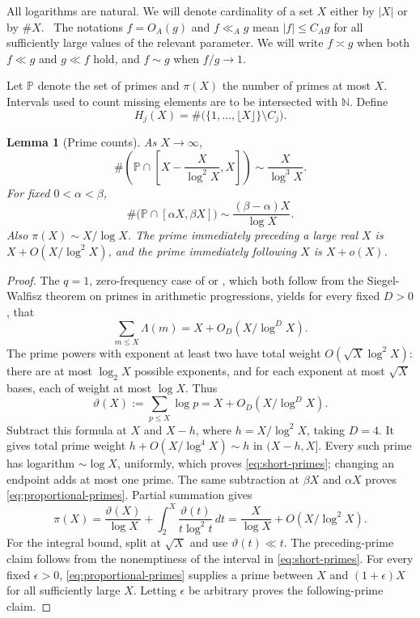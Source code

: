 \documentclass[11pt,letterpaper]{article}
\numberwithin{equation}{section}
\newtheorem{lemma}[theorem]{Lemma}
\theoremstyle{remark}
\newcommand{\N}{\mathbb N}
\newcommand{\Pp}{\mathbb P}
\newcommand{\floor}[1]{\lfloor #1\rfloor}
\begin{document}
All logarithms are natural. We will denote cardinality of a set $X$ either by $|X|$ or by $\# X$. \ 
The notations $f=O_A(g)$ and $f\ll_A g$ mean $|f|\le C_Ag$ for all sufficiently large values of the relevant
parameter. We will write $f\asymp g$ when both $f\ll g$ and $g\ll f$ hold, and $f\sim g$
when $f/g\to1$. 

Let $\Pp$ denote the set of primes and $\pi(X)$
the number of primes at most $X$. Intervals used to count missing
elements are to be intersected with $\N$. Define
\[
 H_j(X)=\#\bigl(\{1,\ldots,\floor X\}\setminus C_j\bigr).
\]

\begin{lemma}[Prime counts]\label{lem:pnt}
As $X\to\infty$,
\begin{equation}\label{eq:short-primes}
 \#\left(\Pp\cap\left[X-\frac{X}{\log^2X},X\right]\right)
 \sim\frac{X}{\log^3X}.
\end{equation}
For fixed $0<\alpha<\beta$,
\begin{equation}\label{eq:proportional-primes}
 \#\bigl(\Pp\cap[\alpha X,\beta X]\bigr)
 \sim\frac{(\beta-\alpha)X}{\log X}.
\end{equation}
Also $\pi(X)\sim X/\log X$. The prime immediately preceding a large
real $X$ is $X+O(X/\log^2X)$, and the prime immediately following $X$
is $X+o(X)$.
\end{lemma}

\begin{proof}
The $q=1$, zero-frequency case of \cite[Lemma 5 (Major arc estimates), equation (26)]{LyallRice} or \cite[Proposition~24]{Tao},  
which both follow from the Siegel-Walfisz theorem on primes in arithmetic progressions, yields
for every fixed $D>0$, that
\[
 \sum_{m\le X}\Lambda(m)=X+O_D(X/\log^D X).
\]
The prime powers with exponent at least two have total weight
$O(\sqrt X\log^2X)$: there are at most $\log_2X$ possible exponents,
and for each exponent at most $\sqrt X$ bases, each of weight at most
$\log X$. Thus
\begin{equation}\label{eq:theta}
 \vartheta(X):=\sum_{p\le X}\log p
 =X+O_D(X/\log^D X).
\end{equation}
Subtract this formula at $X$ and $X-h$, where $h=X/\log^2X$, taking
$D=4$. It gives total prime weight $h+O(X/\log^4X)\sim h$ in
$(X-h,X]$. Every such prime has logarithm $\sim\log X$, uniformly,
which proves \eqref{eq:short-primes}; changing an endpoint adds at most
one prime. The same subtraction at $\beta X$ and $\alpha X$ proves
\eqref{eq:proportional-primes}. Partial summation gives
\[
 \pi(X)=\frac{\vartheta(X)}{\log X}
       +\int_2^X\frac{\vartheta(t)}{t\log^2t}\,dt
 =\frac{X}{\log X}+O(X/\log^2X).
\]
For the integral bound, split at $\sqrt X$ and use $\vartheta(t)\ll t$.
The preceding-prime claim follows from the nonemptiness of the interval
in \eqref{eq:short-primes}. For every fixed $\epsilon>0$,
\eqref{eq:proportional-primes} supplies a prime between $X$ and
$(1+\epsilon)X$ for all sufficiently large $X$. Letting $\epsilon$
be arbitrary proves the following-prime claim.
\end{proof}
\end{document}
